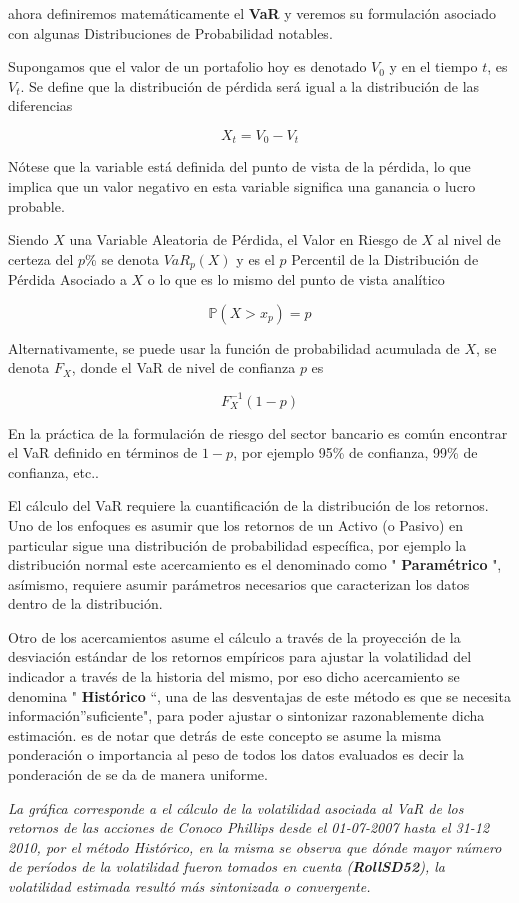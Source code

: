 \documentclass[]{article}
\begin{document}
ahora definiremos matemáticamente el \textbf{VaR} y veremos su
formulación asociado con algunas Distribuciones de Probabilidad
notables.

Supongamos que el valor de un portafolio hoy es denotado \(V_0\) y en el
tiempo \(t\), es \(V_t\). Se define que la distribución de pérdida será
igual a la distribución de las diferencias

\[X_t = V_0 - V_t\]

Nótese que la variable está definida del punto de vista de la pérdida,
lo que implica que un valor negativo en esta variable significa una
ganancia o lucro probable.

Siendo \(X\) una Variable Aleatoria de Pérdida, el Valor en Riesgo de
\(X\) al nivel de certeza del \(p\)\% se denota \(VaR_{p}(X)\) y es el
\(p\) Percentil de la Distribución de Pérdida Asociado a \(X\) o lo que
es lo mismo del punto de vista analítico

\[\mathbb{P}(X>x_p)=p\]

Alternativamente, se puede usar la función de probabilidad acumulada de
\(X\), se denota \(F_X\), donde el VaR de nivel de confianza \(p\) es

\[F_{X}^{-1}(1-p)\]

En la práctica de la formulación de riesgo del sector bancario es común
encontrar el VaR definido en términos de \(1-p\), por ejemplo 95\% de
confianza, 99\% de confianza, etc..

El cálculo del VaR requiere la cuantificación de la distribución de los
retornos. Uno de los enfoques es asumir que los retornos de un Activo (o
Pasivo) en particular sigue una distribución de probabilidad específica,
por ejemplo la distribución normal este acercamiento es el denominado
como " \textbf{Paramétrico} ", asímismo, requiere asumir parámetros
necesarios que caracterizan los datos dentro de la distribución.

Otro de los acercamientos asume el cálculo a través de la proyección de
la desviación estándar de los retornos empíricos para ajustar la
volatilidad del indicador a través de la historia del mismo, por eso
dicho acercamiento se denomina " \textbf{Histórico} ``, una de las
desventajas de este método es que se necesita información''suficiente",
para poder ajustar o sintonizar razonablemente dicha estimación. es de
notar que detrás de este concepto se asume la misma ponderación o
importancia al peso de todos los datos evaluados es decir la ponderación
de se da de manera uniforme.

\emph{La gráfica corresponde a el cálculo de la volatilidad asociada al
VaR de los retornos de las acciones de Conoco Phillips desde el
01-07-2007 hasta el 31-12 2010, por el método Histórico, en la misma se
observa que dónde mayor número de períodos de la volatilidad fueron
tomados en cuenta (\textbf{RollSD52}), la volatilidad estimada resultó
más sintonizada o convergente.}
\end{document}
